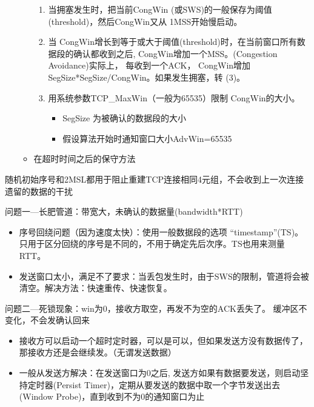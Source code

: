 \begin{itemize}
\begin{itemize}
\begin{enumerate}
            \item 当拥塞发生时，把当前CongWin (或SWS)的一般保存为阈值(threshold)，然后CongWin又从 1MSS开始慢启动。
            \item 当 CongWin增长到等于或大于阈值(threshold)时，在当前窗口所有数据段的确认都收到之后, CongWin增加一个MSS。(Congestion Avoidance)实际上， 每收到一个ACK， CongWin增加SegSize*SegSize/CongWin。如果发生拥塞，转 (3)。
            \item 用系统参数TCP\_MaxWin（一般为65535）限制 CongWin的大小。
            \begin{itemize}
                \item SegSize 为被确认的数据段的大小
                \item 假设算法开始时通知窗口大小AdvWin=65535
            \end{itemize}
        \end{enumerate}
        \item 在超时时间之后的保守方法
    \end{itemize}
\end{itemize}

随机初始序号和2MSL都用于阻止重建TCP连接相同4元组，不会收到上一次连接遗留的数据的干扰

问题一---长肥管道：带宽大，未确认的数据量(bandwidth*RTT)
\begin{itemize}
\item 序号回绕问题（因为速度太快）：使用一般数据段的选项 “timestamp”(TS)。只用于区分回绕的序号是不同的，不用于确定先后次序。TS也用来测量RTT。
\item 发送窗口太小，满足不了要求：当丢包发生时，由于SWS的限制，管道将会被清空。解决方法：快速重传、快速恢复。
\end{itemize}

问题二---死锁现象：win为0，接收方取空，再发不为空的ACK丢失了。
缓冲区不变化，不会发确认回来
\begin{itemize}
\item 接收方可以启动一个超时定时器，可以是可以，但如果发送方没有数据传了，那接收方还是会继续发。（无谓发送数据）
\item 一般从发送方解决：在发送窗口为0之后, 发送方如果有数据要发送，则启动坚持定时器(Persist Timer)，定期从要发送的数据中取一个字节发送出去(Window Probe)，直到收到不为0的通知窗口为止
\end{itemize}

